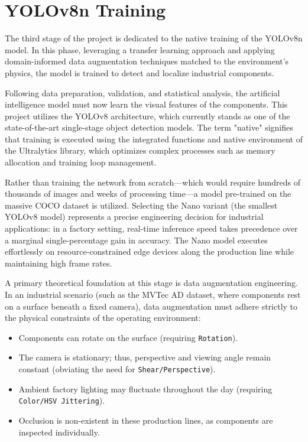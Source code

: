 \documentclass{article}
\begin{document}
\section{YOLOv8n Training}

The third stage of the project is dedicated to the native training of the YOLOv8n model. In this phase, leveraging a transfer learning approach and applying domain-informed data augmentation techniques matched to the environment's physics, the model is trained to detect and localize industrial components.

Following data preparation, validation, and statistical analysis, the artificial intelligence model must now learn the visual features of the components. This project utilizes the YOLOv8 architecture, which currently stands as one of the state-of-the-art single-stage object detection models. The term "native" signifies that training is executed using the integrated functions and native environment of the Ultralytics library, which optimizes complex processes such as memory allocation and training loop management.

Rather than training the network from scratch—which would require hundreds of thousands of images and weeks of processing time—a model pre-trained on the massive COCO dataset is utilized. Selecting the Nano variant (the smallest YOLOv8 model) represents a precise engineering decision for industrial applications: in a factory setting, real-time inference speed takes precedence over a marginal single-percentage gain in accuracy. The Nano model executes effortlessly on resource-constrained edge devices along the production line while maintaining high frame rates.

A primary theoretical foundation at this stage is data augmentation engineering. In an industrial scenario (such as the MVTec AD dataset, where components rest on a surface beneath a fixed camera), data augmentation must adhere strictly to the physical constraints of the operating environment:

\begin{itemize}
	\item Components can rotate on the surface (requiring \texttt{Rotation}).
	\item The camera is stationary; thus, perspective and viewing angle remain constant (obviating the need for \texttt{Shear/Perspective}).
	\item Ambient factory lighting may fluctuate throughout the day (requiring \texttt{Color/HSV Jittering}).
	\item Occlusion is non-existent in these production lines, as components are inspected individually.
\end{itemize}
\end{document}

